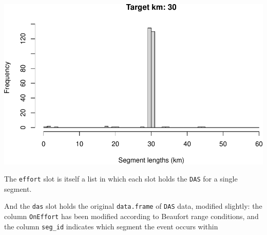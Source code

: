 \documentclass[
]{book}
\newenvironment{Shaded}{\begin{snugshade}}{\end{snugshade}}
\newcommand{\DecValTok}[1]{\textcolor[rgb]{0.00,0.00,0.81}{#1}}
\newcommand{\NormalTok}[1]{#1}
\newcommand{\OperatorTok}[1]{\textcolor[rgb]{0.81,0.36,0.00}{\textbf{#1}}}
\newcommand{\StringTok}[1]{\textcolor[rgb]{0.31,0.60,0.02}{#1}}
\begin{document}
\includegraphics{figures/unnamed-chunk-37-1.pdf}

The \texttt{effort} slot is itself a list in which each slot holds the \texttt{DAS} for a single segment.

\begin{Shaded}
\end{Shaded}

And the \texttt{das} slot holds the original \texttt{data.frame} of \texttt{DAS} data, modified slightly: the column \texttt{OnEffort} has been modified according to Beaufort range conditions, and the column \texttt{seg\_id} indicates which segment the event occurs within
\end{document}
